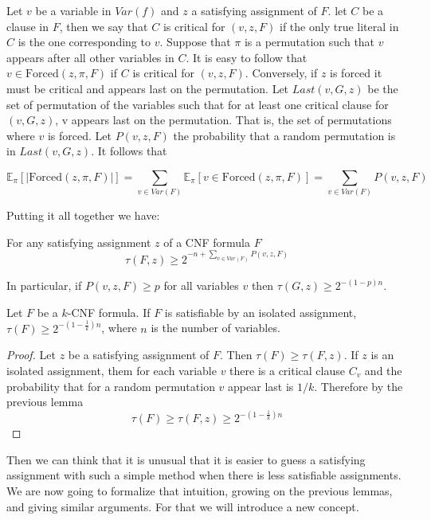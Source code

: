 Let $v$ be a variable in $Var(f)$ and $z$ a satisfying assignment of $F$. let $C$ be a clause in $F$, then we say that $C$ is critical for $(v,z,F)$ if the only true literal in $C$ is the one corresponding to $v$. Suppose that $\pi$ is a permutation such that $v$ appears after all other variables in $C$. It is easy to follow that $v \in \text{Forced}(z,\pi,F)$ if $C$ is critical for $(v,z,F)$. Conversely, if $z$ is forced it must be critical and appears last on the permutation. Let $Last(v,G,z)$ be the set of permutation of the variables such that for at least one critical clause for $(v,G,z)$, v appears last on the permutation. That is, the set of permutations where $v$ is forced. Let $P(v,z,F)$ the probability that a random permutation is in $Last(v,G,z)$. It follows that

$$ \mathbb{E}_{\pi}[|\text{Forced}(z, \pi, F)|]= \sum_{v \in Var(F)} \mathbb{E}_{\pi}[v \in \text{Forced}( z, \pi, F)] = \sum_{v \in Var(F)} P(v, z, F)  $$

Putting it all together we have:

\begin{lemma}
  \label{labelito}
  For any satisfying assignment $z$ of a CNF formula $F$
  $$\tau(F,z) \ge 2^{-n + \sum_{v \in Var(F)} P(v, z, F)}$$

  In particular, if $P(v,z,F) \ge p$ for all variables $v$ then $\tau(G,z) \ge 2^{-(1-p)n}$.
\end{lemma}


\begin{theorem}
  Let $F$ be a $k$-CNF formula. If $F$ is satisfiable by an isolated assignment, $\tau(F) \ge 2^{-(1-\frac{1}{k})n}$, where $n$ is the number of variables.
\end{theorem}
\begin{proof}
  Let $z$ be a satisfying assignment of $F$. Then $\tau(F) \ge \tau(F,z)$. If $z$ is an isolated assignment, them for each variable $v$ there is a critical clause $C_v$ and the probability that for a random permutation $v$ appear last is $1/k$. Therefore by the previous lemma  $$\tau(F) \ge \tau(F,z) \ge 2^{-(1-\frac{1}{k})n}$$
\end{proof}


Then we can think that it is unusual that it is easier to guess a satisfying assignment with such a simple method when there is less satisfiable assignments. We are now going to formalize that intuition, growing on the previous lemmas, and giving similar arguments. For that we will introduce a new concept.

